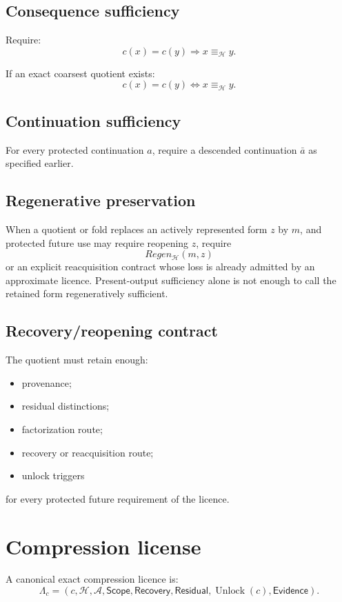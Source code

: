 \documentclass[11pt,oneside]{article}
\newcommand{\Unlock}{\operatorname{Unlock}}
\begin{document}
\subsection{Consequence sufficiency}

Require:
\[
\boxed{
c(x)=c(y)
\Longrightarrow
x\equiv_{\mathcal H}y.
}
\]

If an exact coarsest quotient exists:
\[
c(x)=c(y)
\iff
x\equiv_{\mathcal H}y.
\]

\subsection{Continuation sufficiency}

For every protected continuation \(a\), require a descended continuation \(\bar a\) as specified earlier.


\subsection{Regenerative preservation}

When a quotient or fold replaces an actively represented form \(z\) by \(m\), and protected future use may require reopening \(z\), require
\[
\boxed{
Regen_{\mathcal H}(m,z)
}
\]
or an explicit reacquisition contract whose loss is already admitted by an approximate licence.  Present-output sufficiency alone is not enough to call the retained form regeneratively sufficient.

\subsection{Recovery/reopening contract}

The quotient must retain enough:
\begin{itemize}
\item provenance;
\item residual distinctions;
\item factorization route;
\item recovery or reacquisition route;
\item unlock triggers
\end{itemize}
for every protected future requirement of the licence.

\section{Compression license}

A canonical exact compression licence is:
\[
\boxed{
\Lambda_c
=
(
c,\mathcal H,\mathcal A,
\mathsf{Scope},
\mathsf{Recovery},
\mathsf{Residual},
\Unlock(c),
\mathsf{Evidence}
).
}
\]
\end{document}
